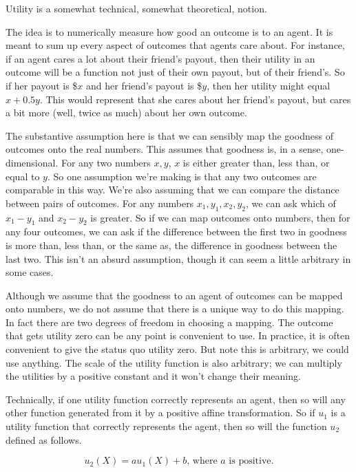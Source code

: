\documentclass[
  11pt,
  letterpaper,
]{scrbook}
\begin{document}
Utility is a somewhat technical, somewhat theoretical, notion.

The idea is to numerically measure how good an outcome is to an agent.
It is meant to sum up every aspect of outcomes that agents care about.
For instance, if an agent cares a lot about their friend's payout, then
their utility in an outcome will be a function not just of their own
payout, but of their friend's. So if her payout is \$\(x\) and her
friend's payout is \$\(y\), then her utility might equal \(x + 0.5y\).
This would represent that she cares about her friend's payout, but cares
a bit more (well, twice as much) about her own outcome.

The substantive assumption here is that we can sensibly map the goodness
of outcomes onto the real numbers. This assumes that goodness is, in a
sense, one-dimensional. For any two numbers \(x, y\), \(x\) is either
greater than, less than, or equal to \(y\). So one assumption we're
making is that any two outcomes are comparable in this way. We're also
assuming that we can compare the distance between pairs of outcomes. For
any numbers \(x_1, y_1, x_2, y_2\), we can ask which of \(x_1 - y_1\)
and \(x_2 - y_2\) is greater. So if we can map outcomes onto numbers,
then for any four outcomes, we can ask if the difference between the
first two in goodness is more than, less than, or the same as, the
difference in goodness between the last two. This isn't an absurd
assumption, though it can seem a little arbitrary in some cases.

Although we assume that the goodness to an agent of outcomes can be
mapped onto numbers, we do not assume that there is a unique way to do
this mapping. In fact there are two degrees of freedom in choosing a
mapping. The outcome that gets utility zero can be any point is
convenient to use. In practice, it is often convenient to give the
status quo utility zero. But note this is arbitrary, we could use
anything. The scale of the utility function is also arbitrary; we can
multiply the utilities by a positive constant and it won't change their
meaning.

Technically, if one utility function correctly represents an agent, then
so will any other function generated from it by a positive affine
transformation. So if \(u_1\) is a utility function that correctly
represents the agent, then so will the function \(u_2\) defined as
follows.

\begin{equation*}
u_2(X) = au_1(X) + b \text{, where }a\text{ is positive}.
\end{equation*}
\end{document}
